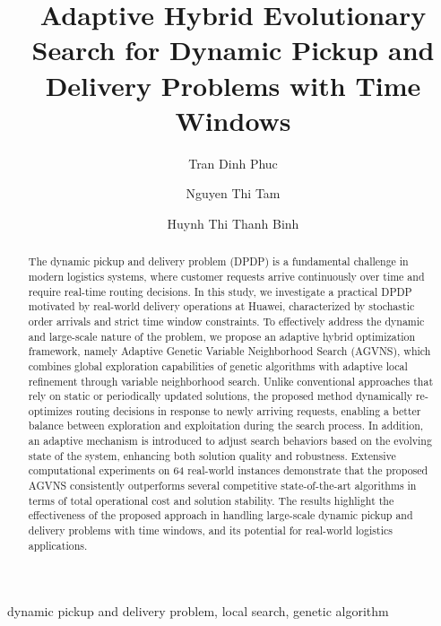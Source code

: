 \documentclass[preprint,12pt]{elsarticle}
\begin{document}
\begin{frontmatter}
\title{	
Adaptive Hybrid Evolutionary Search for Dynamic Pickup and Delivery Problems with Time Windows}
\author[1]{Tran Dinh Phuc}  
        \author[2]{Nguyen Thi Tam }
		\author[1]{Huynh Thi Thanh Binh} 

\begin{abstract}
The dynamic pickup and delivery problem (DPDP) is a fundamental challenge in modern logistics systems, where customer requests arrive continuously over time and require real-time routing decisions. In this study, we investigate a practical DPDP motivated by real-world delivery operations at Huawei, characterized by stochastic order arrivals and strict time window constraints. To effectively address the dynamic and large-scale nature of the problem, we propose an adaptive hybrid optimization framework, namely Adaptive Genetic Variable Neighborhood Search (AGVNS), which combines global exploration capabilities of genetic algorithms with adaptive local refinement through variable neighborhood search.
Unlike conventional approaches that rely on static or periodically updated solutions, the proposed method dynamically re-optimizes routing decisions in response to newly arriving requests, enabling a better balance between exploration and exploitation during the search process. In addition, an adaptive mechanism is introduced to adjust search behaviors based on the evolving state of the system, enhancing both solution quality and robustness.
Extensive computational experiments on 64 real-world instances demonstrate that the proposed AGVNS consistently outperforms several competitive state-of-the-art algorithms in terms of total operational cost and solution stability. The results highlight the effectiveness of the proposed approach in handling large-scale dynamic pickup and delivery problems with time windows, and its potential for real-world logistics applications.
\end{abstract}


\begin{keyword}
dynamic pickup and delivery problem, local search, genetic algorithm
\end{keyword}

\end{frontmatter}
\end{document}
